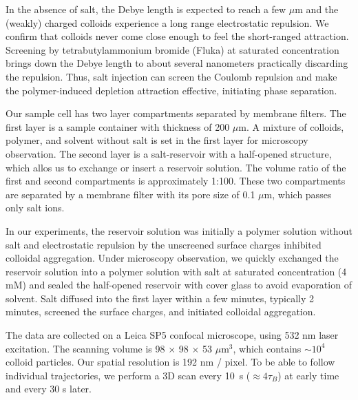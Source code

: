 \documentclass[12pt,onecolumn]{revtex4}
\begin{document}
In the absence of salt, the Debye length is expected to reach a few $\mu$m and the (weakly) charged colloids experience a long range electrostatic repulsion. We confirm that colloids never come close enough to feel the short-ranged attraction. Screening by tetrabutylammonium bromide (Fluka) at saturated concentration brings down the Debye length to about several nanometers practically discarding the repulsion. 
Thus, salt injection can screen the Coulomb repulsion and make the polymer-induced depletion attraction effective, initiating phase separation. 

Our sample cell has two layer compartments separated by membrane filters. The first layer is a sample container with thickness of 200 $\mu$m. A mixture of colloids, polymer, and solvent without salt is  set in the first layer for microscopy observation. The second layer is a salt-reservoir with a half-opened structure, which allos us to exchange or insert a reservoir solution. The volume ratio of the first and second compartments is approximately 1:100. These two compartments are separated by a membrane filter with its pore size of 0.1 $\mu$m, which passes only salt ions. 

In our experiments, the reservoir solution was initially a polymer solution without salt and electrostatic repulsion by the unscreened surface charges inhibited colloidal aggregation. Under microscopy observation, we quickly exchanged the reservoir solution into a polymer solution with salt at saturated concentration (4 mM) and sealed the half-opened reservoir with cover glass to avoid evaporation of solvent. Salt diffused into the first layer within a few minutes, typically 2 minutes, screened the surface charges, and initiated colloidal aggregation. 

The data are collected on a Leica SP5 confocal microscope, using 532 nm laser excitation. The scanning volume is 98 $\times$ 98 $\times$ 53 $\mu$m$^3$, which contains $\sim 10^4$ colloid particles. Our spatial resolution is 192 nm / pixel. To be able to follow individual trajectories, we perform a 3D scan every 10~s ($\approx 4\tau_B$) at early time and every 30 s later.





%
\end{document}
